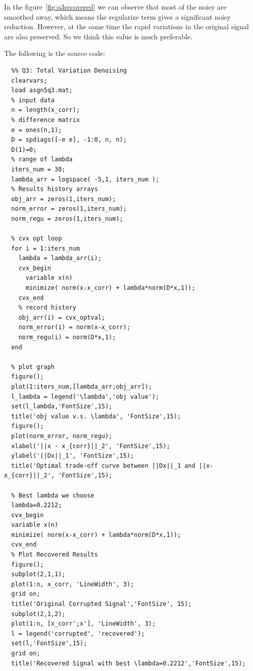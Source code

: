 \message{ !name(ass5_ChangLi.tex)}\documentclass[10pt,a4paper]{article}
\begin{document}
In the figure~\ref{fig:q3recovered} we can observe that most of the noisy are
smoothed away, which means the regularize term gives a
significant noisy reduction. However, at the same time the
rapid variations in the original signal are also preserved.
So we think this value is much preferable.

The following is the source code:
\begin{lstlisting}
  %% Q3: Total Variation Denoising
  clearvars;
  load asgn5q3.mat;
  % input data
  n = length(x_corr);
  % difference matrix
  e = ones(n,1);
  D = spdiags([-e e], -1:0, n, n);
  D(1)=0;
  % range of lambda
  iters_num = 30;
  lambda_arr = logspace( -5,1, iters_num );
  % Results history arrays
  obj_arr = zeros(1,iters_num);
  norm_error = zeros(1,iters_num);
  norm_regu = zeros(1,iters_num);

  % cvx opt loop
  for i = 1:iters_num
    lambda = lambda_arr(i);
    cvx_begin
      variable x(n)
      minimize( norm(x-x_corr) + lambda*norm(D*x,1));
    cvx_end
    % record history
    obj_arr(i) = cvx_optval;
    norm_error(i) = norm(x-x_corr);
    norm_regu(i) = norm(D*x,1);
  end

  % plot graph
  figure();
  plot(1:iters_num,[lambda_arr;obj_arr]);
  l_lambda = legend('\lambda','obj value');
  set(l_lambda,'FontSize',15);
  title('obj value v.s. \lambda', 'FontSize',15);
  figure();
  plot(norm_error, norm_regu);
  xlabel('||x - x_{corr}||_2', 'FontSize',15);
  ylabel('||Dx||_1', 'FontSize',15);
  title('Optimal trade-off curve between ||Dx||_1 and ||x-x_{corr}||_2', 'FontSize',15);

  % Best lambda we choose
  lambda=0.2212;
  cvx_begin
  variable x(n)
  minimize( norm(x-x_corr) + lambda*norm(D*x,1));
  cvx_end
  % Plot Recovered Results
  figure();
  subplot(2,1,1);
  plot(1:n, x_corr, 'LineWidth', 3);
  grid on;
  title('Original Corrupted Signal','FontSize', 15);
  subplot(2,1,2);
  plot(1:n, [x_corr';x'], 'LineWidth', 3);
  l = legend('corrupted', 'recovered');
  set(l,'FontSize',15);
  grid on;
  title('Recovered Signal with best \lambda=0.2212','FontSize',15);
\end{lstlisting}

	\renewcommand\refname{Bibliography}
	
	
\end{document}
